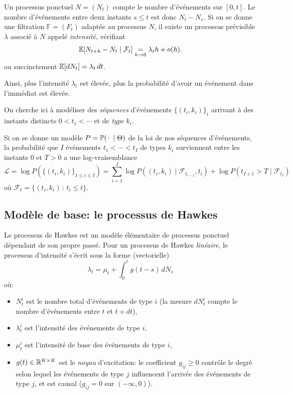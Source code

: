 \documentclass[../main.tex]{subfiles}
\begin{document}
Un processus ponctuel $N = (N_t)$ compte le nombre d'événements sur $[0,t]$. Le nombre d'événements entre deux instants $s\leq t$ est donc $N_t - N_s$. Si on se donne une filtration $\mathds{F} = (F_t)$ adaptée au processus $N$, il existe un processus prévisible $\lambda$ associé à $N$ appelé \textit{intensité}, vérifiant
\[
	\mathbb{E} [N_{t+h} - N_t \mid \mathcal{F}_t] \underset{h\to 0}{=} \lambda_th + o(h).
\]
ou succinctement $\mathbb{E}[dN_t] = \lambda_t\,dt$.

Ainsi, plus l'intensité $\lambda_t$ est élevée, plus la probabilité d'avoir un événement dans l'immédiat est élevée.

On cherche ici à modéliser des \textit{séquences} d'événements ${\{(t_i,k_i)\}}_i$ arrivant à des instants distincts $0<t_1 < \cdots$ et de \textit{type} $k_i$.

Si on se donne un modèle $P = \mathbb{P}(\,\cdot\,\mid \Theta)$ de la loi de nos séquences d'événements, la probabilité que $I$ événements $t_1<\cdots<t_I$ de types $k_i$ surviennent entre les instants $0$ et $T > 0$ a une log-vraisemblance
\begin{equation}\label{eq:likelihood}
	\mathcal{L} =
	\log P(\{(t_i,k_i)\}_{1\leq i\leq I}) =
	\sum_{i=1}^{I} \log P((t_i,k_i)\mid \mathcal{F}_{t_{i-1}}, t_i)
	+ \log P(t_{I+1}>T\mid \mathcal{F}_{t_{I}})
\end{equation}
où $\mathcal{F}_t = \{ (t_i,k_i)\,:\, t_i \leq t \}$.


\subsection{Modèle de base: le processus de Hawkes}

Le processus de Hawkes est un modèle élémentaire de processus ponctuel dépendant de son propre passé. Pour un processus de Hawkes \textit{linéaire}, le processus d'intensité s'écrit sous la forme (vectorielle)
\begin{equation}
\lambda_t = \mu_t + \int_0^t g(t-s)\,dN_s
\end{equation}
où:\begin{itemize}
	\item $N^i_t$ est le nombre total d'événements de type $i$ (la mesure $dN^i_t$ compte le nombre d'événements entre $t$ et $t+dt$),
	\item $\lambda_t^i$ est l'intensité des événements de type $i$,
	\item $\mu^i_t$ est l'intensité de base des événements de type $i$,
	\item $g(t) \in \mathbb{R}^{K\times K}$ est le \textit{noyau} d'excitation: le coefficient $g_{ij} \geq 0$ contrôle le degré selon lequel les événements de type $j$ influencent l'arrivée des événements de type $j$, et est causal ($g_{ij} = 0$ sur $(-\infty, 0)$).
\end{itemize}
\end{document}
